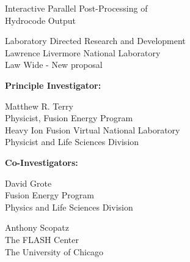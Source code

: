 \documentclass[letterpaper,12pt]{article}
\begin{document}
\begin{center}
	\LARGE
	\color{red}
	Interactive Parallel Post-Processing of \\ Hydrocode Output
\end{center}

\vspace{0.5in}

\setlength{\parindent}{0pt}
\large
Laboratory Directed Research and Development \\
Lawrence Livermore National Laboratory \\
Law Wide - New proposal

\normalsize
\begin{multicols}{2}
\textbf{Principle Investigator:}
\columnbreak

Matthew R. Terry \\
Physicist, Fusion Energy Program \\
Heavy Ion Fusion Virtual National Laboratory \\
Physicist and Life Sciences Division

\end{multicols}


\textbf{Co-Investigators:}
\begin{multicols}{2}
	David Grote \\
	Fusion Energy Program \\
	Physics and Life Sciences Division\\
	\columnbreak
			
	Anthony Scopatz \\
	The FLASH Center \\
	The University of Chicago \\
\end{multicols}




\end{document}
